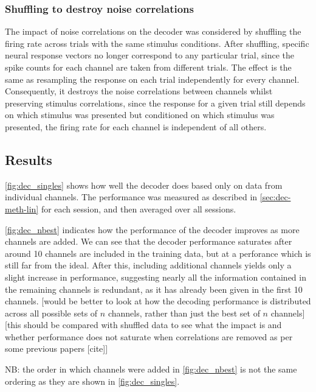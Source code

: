 \subsubsection{Shuffling to destroy noise correlations}

The impact of noise correlations on the decoder was considered by shuffling the firing rate across trials with the same stimulus conditions.
After shuffling, specific neural response vectors no longer correspond to any particular trial, since the spike counts for each channel are taken from different trials.
The effect is the same as resampling the response on each trial independently for every channel.
Consequently, it destroys the noise correlations between channels whilst preserving stimulus correlations, since the response for a given trial still depends on which stimulus was presented but conditioned on which stimulus was presented, the firing rate for each channel is independent of all others.


\subsection{Results}

\autoref{fig:dec_singles} shows how well the decoder does based only on data from individual channels.
The performance was measured as described in \autoref{sec:dec-meth-lin} for each session, and then averaged over all sessions.

\autoref{fig:dec_nbest} indicates how the performance of the decoder improves as more channels are added.
We can see that the decoder performance saturates after around 10 channels are included in the training data, but at a perforance which is still far from the ideal.
After this, including additional channels yields only a slight increase in performance, suggesting nearly all the information contained in the remaining channels is redundant, as it has already been given in the first 10 channels.
[would be better to look at how the decoding performance is distributed across all possible sets of $n$ channels, rather than just the best set of $n$ channels] [this should be compared with shuffled data to see what the impact is and whether performance does not saturate when correlations are removed as per some previous papers [cite]]

NB: the order in which channels were added in \autoref{fig:dec_nbest} is not the same ordering as they are shown in \autoref{fig:dec_singles}.

